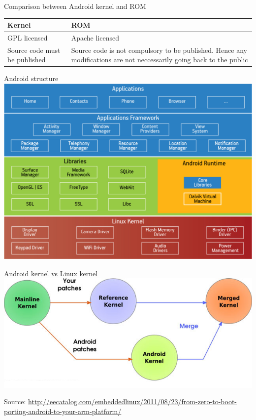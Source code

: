 \documentclass{beamer}
\begin{document}
\begin{frame}{Comparison between Android kernel and ROM}

\begin{table}
 \begin{tabular} { p{5cm}| p{5cm} }
 \hline\hline
  Kernel&ROM\\
  \hline
  
  GPL licensed & Apache licensed\\
  \hline
  
  Source code must be published & Source code is not compulsory to be published.
  Hence any modifications are not neccessarily going back to the public\\
  
  \hline
  
 \end{tabular}

\end{table}
\end{frame}


\begin{frame}{Android structure}
 \includegraphics[scale=0.3]{android.jpg}
\end{frame}


\begin{frame}{Android kernel vs Linux kernel}
 \includegraphics[scale=0.6]{kernel.png}
 
 \tiny Source: \url{http://eecatalog.com/embeddedlinux/2011/08/23/from-zero-to-boot-porting-android-to-your-arm-platform/}
\end{frame}
\end{document}
